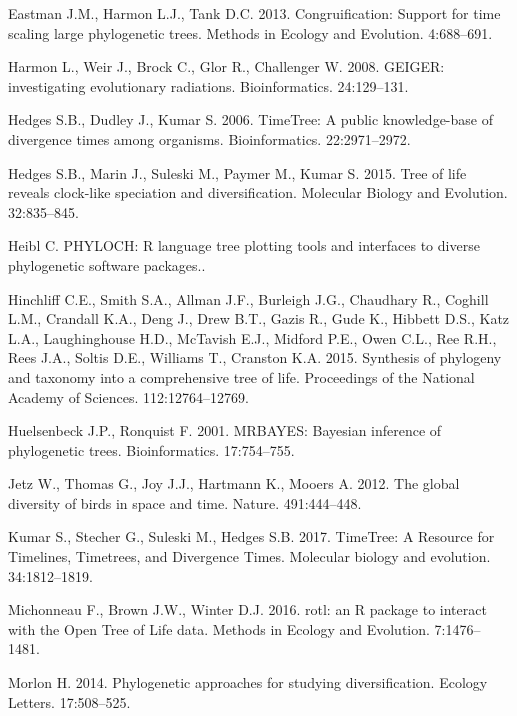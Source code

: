 \documentclass[]{article}
\begin{document}
\leavevmode\hypertarget{ref-Eastman2013}{}%
Eastman J.M., Harmon L.J., Tank D.C. 2013. Congruification: Support for time scaling large phylogenetic trees. Methods in Ecology and Evolution. 4:688--691.

\leavevmode\hypertarget{ref-Harmon2008}{}%
Harmon L., Weir J., Brock C., Glor R., Challenger W. 2008. GEIGER: investigating evolutionary radiations. Bioinformatics. 24:129--131.

\leavevmode\hypertarget{ref-Hedges2006}{}%
Hedges S.B., Dudley J., Kumar S. 2006. TimeTree: A public knowledge-base of divergence times among organisms. Bioinformatics. 22:2971--2972.

\leavevmode\hypertarget{ref-Hedges2015}{}%
Hedges S.B., Marin J., Suleski M., Paymer M., Kumar S. 2015. Tree of life reveals clock-like speciation and diversification. Molecular Biology and Evolution. 32:835--845.

\leavevmode\hypertarget{ref-Heibl2008}{}%
Heibl C. PHYLOCH: R language tree plotting tools and interfaces to diverse phylogenetic software packages..

\leavevmode\hypertarget{ref-Hinchliff2015}{}%
Hinchliff C.E., Smith S.A., Allman J.F., Burleigh J.G., Chaudhary R., Coghill L.M., Crandall K.A., Deng J., Drew B.T., Gazis R., Gude K., Hibbett D.S., Katz L.A., Laughinghouse H.D., McTavish E.J., Midford P.E., Owen C.L., Ree R.H., Rees J.A., Soltis D.E., Williams T., Cranston K.A. 2015. Synthesis of phylogeny and taxonomy into a comprehensive tree of life. Proceedings of the National Academy of Sciences. 112:12764--12769.

\leavevmode\hypertarget{ref-Huelsenbeck2001}{}%
Huelsenbeck J.P., Ronquist F. 2001. MRBAYES: Bayesian inference of phylogenetic trees. Bioinformatics. 17:754--755.

\leavevmode\hypertarget{ref-Jetz2012}{}%
Jetz W., Thomas G., Joy J.J., Hartmann K., Mooers A. 2012. The global diversity of birds in space and time. Nature. 491:444--448.

\leavevmode\hypertarget{ref-Kumar2017}{}%
Kumar S., Stecher G., Suleski M., Hedges S.B. 2017. TimeTree: A Resource for Timelines, Timetrees, and Divergence Times. Molecular biology and evolution. 34:1812--1819.

\leavevmode\hypertarget{ref-Michonneau2016}{}%
Michonneau F., Brown J.W., Winter D.J. 2016. rotl: an R package to interact with the Open Tree of Life data. Methods in Ecology and Evolution. 7:1476--1481.

\leavevmode\hypertarget{ref-Morlon2014}{}%
Morlon H. 2014. Phylogenetic approaches for studying diversification. Ecology Letters. 17:508--525.
\end{document}
